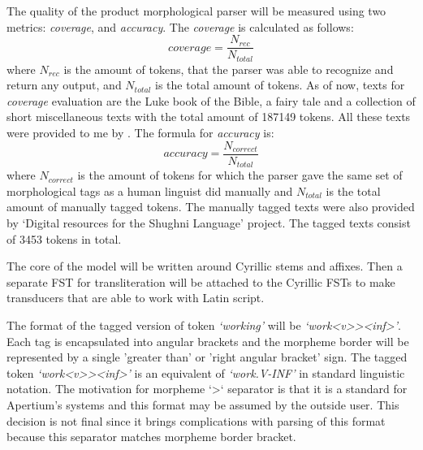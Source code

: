 \par The quality of the product morphological parser will be measured using two metrics: \textit{coverage}, and \textit{accuracy}. The \textit{coverage} is calculated as follows: \[coverage = \frac{N_{rec}}{N_{total}}\] where $N_{rec}$ is the amount of tokens, that the parser was able to recognize and return any output, and $N_{total}$ is the total amount of tokens. As of now, texts for \textit{coverage} evaluation are the Luke book of the Bible, a fairy tale and a collection of short miscellaneous texts with the total amount of 187149 tokens. All these texts were provided to me by \textcite{makarov_digital_2022}. The formula for \textit{accuracy} is: \[accuracy = \frac{N_{correct}}{N_{total}}\] where $N_{correct}$ is the amount of tokens for which the parser gave the same set of morphological tags as a human linguist did manually and $N_{total}$ is the total amount of manually tagged tokens. The manually tagged texts were also provided by `Digital resources for the Shughni Language' project. The tagged texts consist of 3453 tokens in total.
\par The core of the model will be written around Cyrillic stems and affixes. Then a separate FST for transliteration will be attached to the Cyrillic FSTs to make transducers that are able to work with Latin script.
\par The format of the tagged version of token \textit{`working'} will be \textit{`work<v>{}><inf>'}. Each tag is encapsulated into angular brackets and the morpheme border will be represented by a single 'greater than' or 'right angular bracket' sign. The tagged token \textit{`work<v>{}><inf>'} is an equivalent of \textit{`work.V-INF'} in standard linguistic notation. The motivation for morpheme `>` separator is that it is a standard for Apertium's systems and this format may be assumed by the outside user. This decision is not final since it brings complications with parsing of this format because this separator matches morpheme border bracket.
